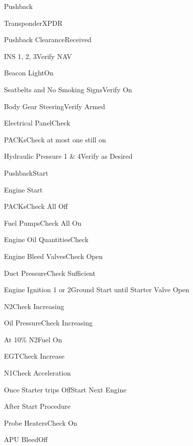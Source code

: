 \documentclass[sim-use, blue_items]{checklist}
\begin{document}
\begin{checklist}{Pushback}
	\item{Transponder}{XPDR}
	\item{Pushback Clearance}{Received}
	\item{INS 1, 2, 3}{Verify NAV}
	\item{Beacon Light}{On}
	\item{Seatbelts and No Smoking Signs}{Verify On}
	\item{Body Gear Steering}{Verify Armed}
	\item{Electrical Panel}{Check}
	\item{PACKs}{Check at most one still on}
	\item{Hydraulic Pressure 1 \& 4}{Verify as Desired}
	\item{Pushback}{Start}
\end{checklist}

\begin{checklist}{Engine Start}
	\item{PACKs}{Check All Off}
	\item{Fuel Pumps}{Check All On}
	\item{Engine Oil Quantities}{Check}
	\item{Engine Bleed Valves}{Check Open}
	\item{Duct Pressure}{Check Sufficient}
	 {
		\item{Engine Ignition 1 or 2}{Ground Start until Starter Valve Open}
		\item{N2}{Check Increasing}
		\item{Oil Pressure}{Check Increasing}
		\item{At 10\% N2}{Fuel On}
		\item{EGT}{Check Increase}
		\item{N1}{Check Acceleration}
		\item{Once Starter trips Off}{Start Next Engine}
	}
\end{checklist}

\begin{checklist}{After Start Procedure}
	\item{Probe Heaters}{Check On}
	\item{APU Bleed}{Off}
\end{checklist}
\end{document}
